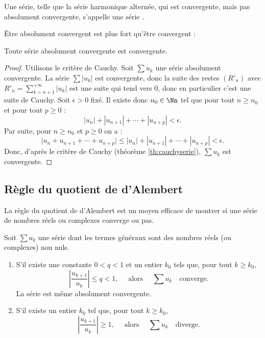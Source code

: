 \documentclass[class=report,crop=false]{standalone}
\begin{document}
Une série, telle que la série harmonique alternée, qui est convergente, 
mais pas absolument convergente, s'appelle une série .

\medskip

\^Etre absolument convergent est plus fort qu'être convergent :
\begin{theoreme}
Toute série absolument convergente est convergente.
\end{theoreme}

\begin{proof}
Utilisons le critère de Cauchy.  Soit $\sum u_k$ une série absolument convergente.
La série $\sum |u_k|$ est convergente, donc la suite des restes $(R'_n)$ avec 
$R'_n = \sum_{k=n+1}^{+\infty} |u_k|$ est une suite 
qui tend vers $0$, donc en particulier c'est une suite de Cauchy.
Soit $\epsilon>0$ fixé. Il existe donc $n_0 \in \Nn$ tel que 
pour tout $n \ge n_0$ et pour tout $p \ge 0$ :
$$|u_n|+|u_{n+1}|+\cdots+|u_{n+p}| < \epsilon.$$
Par suite, pour $n \ge n_0$ et  $p \ge 0$ on a :
$$\big|u_n+u_{n+1}+\cdots+u_{n+p}\big| \le |u_n|+|u_{n+1}|+\cdots+|u_{n+p}| < \epsilon.$$
Donc, d'après le critère de Cauchy 
(théorème \ref{th:cauchyserie}), $\sum u_k$ est convergente.
\end{proof}


\subsection{Règle du quotient de d'Alembert}

La règle du quotient de d'Alembert est un moyen efficace de montrer 
si une série de nombres réels ou complexes converge ou pas.

\begin{theoreme}
\label{th:regledalembert}
Soit $\sum u_k$ une série dont les termes généraux sont des nombres réels (ou complexes) non nuls.
\begin{enumerate}
\item S'il existe une constante $0<q<1$ et un entier $k_0$ tels que, pour tout
$k \ge k_0$,  
$$
\left|\frac{u_{k+1}}{u_k}\right| \le q <1,\quad \text{ alors }\quad\sum u_k\quad \text{converge.}
$$
La série est même absolument convergente.
\item S'il existe un entier $k_0$ tel que, pour tout $k \ge k_0$, 
$$
\left|\frac{u_{k+1}}{u_k}\right| \ge 1,\quad \text{ alors }\quad\sum u_k \quad\text{diverge.}
$$
\end{enumerate}
\end{theoreme}
\end{document}
